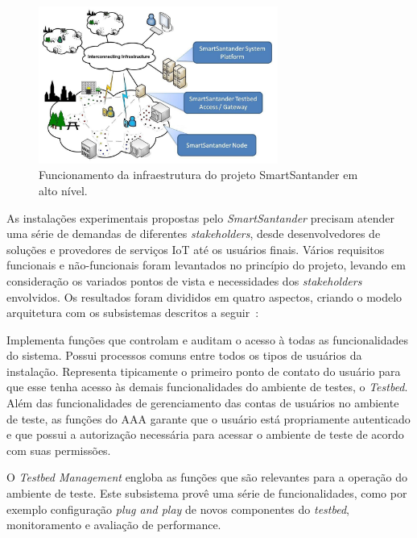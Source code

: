 \begin{figure}[H]
	\centering
		\includegraphics[width=0.7\textwidth]{fig/smartsantander.jpg}
	\caption{Funcionamento da infraestrutura do projeto SmartSantander em alto nível.}
\end{figure}

As instalações experimentais propostas pelo \textit{SmartSantander} precisam atender uma série de demandas
de diferentes \textit{stakeholders}, desde desenvolvedores de soluções e provedores de serviços IoT até os usuários finais.
Vários requisitos funcionais e não-funcionais foram levantados no princípio do projeto, levando em consideração
os variados pontos de vista e necessidades dos \textit{stakeholders} envolvidos. Os resultados foram divididos em quatro
aspectos, criando o modelo arquitetura com os subsistemas descritos a seguir~\cite{citeulike:13508566}:


Implementa funções que controlam e auditam o acesso à todas as funcionalidades do sistema. Possui processos
comuns entre todos os tipos de usuários da instalação. Representa tipicamente o primeiro ponto de contato
do usuário para que esse tenha acesso às demais funcionalidades do ambiente de testes, o \textit{Testbed}.
Além das funcionalidades de gerenciamento das contas de usuários no ambiente de teste, as funções
do AAA garante que o usuário está propriamente autenticado e que possui a autorização necessária para
acessar o ambiente de teste de acordo com suas permissões.

O \textit{Testbed Management} engloba as funções que são relevantes para a operação do ambiente de teste.
Este subsistema provê uma série de funcionalidades, como por exemplo configuração \textit{plug and play}
de novos componentes do \textit{testbed}, monitoramento e avaliação de performance.



